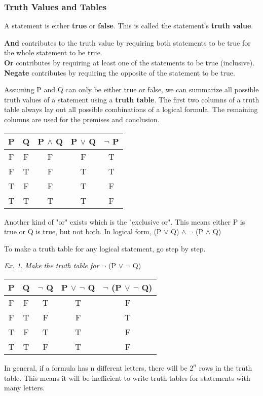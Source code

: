 \documentclass[11pt]{article}
\theoremstyle{definition}
\theoremstyle{remark}
\newtheorem{exer}{Ex.}
\begin{document}
\subsubsection{Truth Values and Tables}
A statement is either \textbf{true} or \textbf{false}. This is called the statement's \textbf{truth value}.
\begin{shaded}
\textbf{And} contributes to the truth value by requiring both statements to be true for the whole statement to be true. \\
\textbf{Or} contributes by requiring at least one of the statements to be true (inclusive). \\
\textbf{Negate} contributes by requiring the opposite of the statement to be true.
\end{shaded}
Assuming P and Q can only be either true or false, we can summarize all possible truth values of a statement using a \textbf{truth table}. The first two columns
of a truth table always lay out all possible combinations of a logical formula. The remaining columns
are used for the premises and conclusion.

\begin{center}
\begin{tabular}{ c  c | c | c | c }
    P & Q & P $\land$ Q & P $\lor$ Q & $\neg$ P \\
    \hline
    F & F & F & F & T \\
    F & T & F & T & T \\
    T & F & F & T & F \\
    T & T & T & T & F
\end{tabular}
\end{center}

Another kind of "or" exists which is the "exclusive or". This means either P is true or Q is true, but not both. In logical form, (P $\lor$ Q) $\land$ $\neg$ (P $\land$ Q)

To make a truth table for any logical statement, go step by step.
\begin{exer}
\textit{Make the truth table for} $\neg$ (P $\lor$ $\neg$ Q)
\begin{center}
\begin{tabular}{ c  c | c | c | c }
    P & Q & $\neg$ Q & P $\lor$ $\neg$ Q & $\neg$ (P $\lor$ $\neg$ Q) \\
    \hline
    F & F & T & T & F \\
    F & T & F & F & T \\
    T & F & T & T & F \\
    T & T & F & T & F
\end{tabular}
\end{center}
\end{exer}
In general, if a formula has n different letters, there will be $2^n$ rows in the truth table.
This means it will be inefficient to write truth tables for statements with many letters.
\end{document}
